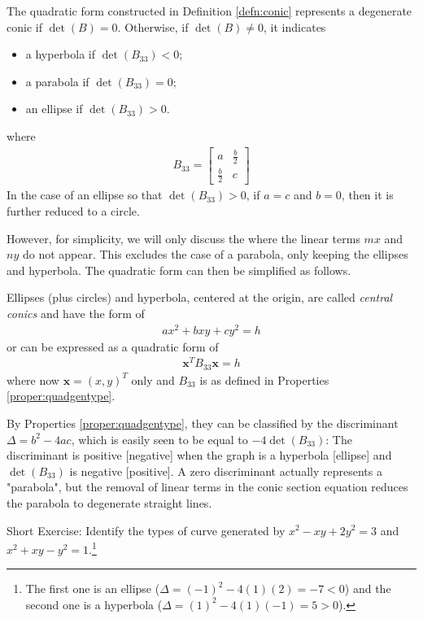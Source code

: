 \begin{proper}
\label{proper:quadgentype}
The quadratic form constructed in Definition \ref{defn:conic} represents a degenerate conic if $\det(B) = 0$. Otherwise, if $\det(B) \neq 0$, it indicates
\begin{itemize}
    \item a hyperbola if $\det(B_{33}) < 0$;
    \item a parabola if $\det(B_{33}) = 0$;
    \item an ellipse if $\det(B_{33}) > 0$.
\end{itemize}
where
\begin{align*}
B_{33} = 
\begin{bmatrix}
a & \frac{b}{2} \\
\frac{b}{2} & c 
\end{bmatrix}
\end{align*}
In the case of an ellipse so that $\det(B_{33}) > 0$, if $a = c$ and $b = 0$, then it is further reduced to a circle.
\end{proper}
However, for simplicity, we will only discuss the  where the linear terms $mx$ and $ny$ do not appear. This excludes the case of a parabola, only keeping the ellipses and hyperbola. The quadratic form can then be simplified as follows.
\begin{proper}
\label{proper:quadcentraltype}
Ellipses (plus circles) and hyperbola, centered at the origin, are called \textit{central conics} and have the form of
\begin{align}
ax^2 + bxy + cy^2 = h
\end{align}
or can be expressed as a quadratic form of
\begin{align}
\textbf{x}^T B_{33} \textbf{x} = h \label{eqn:xB33x}
\end{align}
where now $\textbf{x} = (x,y)^T$ only and $B_{33}$ is as defined in Properties \ref{proper:quadgentype}.
\end{proper}
By Properties \ref{proper:quadgentype}, they can be classified by the discriminant $\Delta = b^2 - 4ac$, which is easily seen to be equal to $-4\det(B_{33})$: The discriminant is positive [negative] when the graph is a hyperbola [ellipse] and $\det(B_{33})$ is negative [positive]. A zero discriminant actually represents a "parabola", but the removal of linear terms in the conic section equation reduces the parabola to degenerate straight lines. \par
Short Exercise: Identify the types of curve generated by $x^2 - xy + 2y^2 = 3$ and $x^2 + xy - y^2 = 1$.\footnote{The first one is an ellipse ($\Delta = (-1)^2 - 4(1)(2) = -7 < 0$) and the second one is a hyperbola ($\Delta = (1)^2 - 4(1)(-1) = 5 > 0$).}\par
